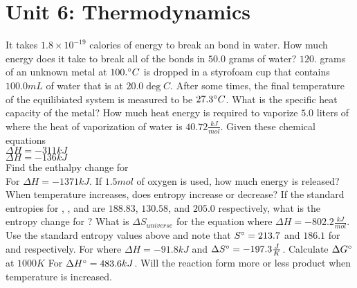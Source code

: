 \documentclass[../main.tex]{subfiles}
\begin{document}
\section{Unit 6: Thermodynamics}
\ProblemSet
It takes \(1.8\times 10^{-19}\) calories of energy to break an  bond in water. How much energy does it take to break all of the 
bonds in \(50.0\) grams of water?
\ProblemSet
\(120.\) grams of an unknown metal at \(100.\degree C\) is dropped in a styrofoam cup  that contains \(100.0mL\) of water that is at \(20.0\deg C\). After some times,
the final temperature of the equilibiated system is measured to be \(27.3\degree C\). What is the specific heat capacity of the metal?
\ProblemSet
How much heat energy is required to vaporize \(5.0\) liters of  where the heat of vaporization of water is \(40.72\frac{kJ}{mol}\).
\ProblemSet
Given these chemical equations \\
 \hspace{1em} \(\Delta H = -311kJ\) \\
 \hspace{1em} \(\Delta H = -136kJ\) \\
Find the enthalpy change for \\
\ProblemSet
For  \hspace{1em} \(\Delta H = -1371kJ\). If \(1.5mol\) of oxygen is used, how much energy is released?
\ProblemSet
When temperature increases, does entropy increase or decrease?
\ProblemSet
If the standard entropies for , , and  are \(188.83\), \(130.58\), and \(205.0\) respectively, what is the entropy change for ? 
\ProblemSet
What is \(\Delta S_{universe}\) for the equation  where \(\Delta H = -802.2\frac{kJ}{mol}\). Use the standard entropy values above and note that \(S\degree = 213.7\) and \(186.1\) for  and  respectively. 
\ProblemSet
For  where \(\Delta H = -91.8 kJ\) and \(\Delta S\degree = -197.3\frac{J}{K}\). Calculate \(\Delta G\degree\) at \(1000K\)
\ProblemSet
For  \hspace{1em} \(\Delta H\degree = 483.6kJ\). Will the reaction form more or less product when temperature is increased. 
\end{document}

